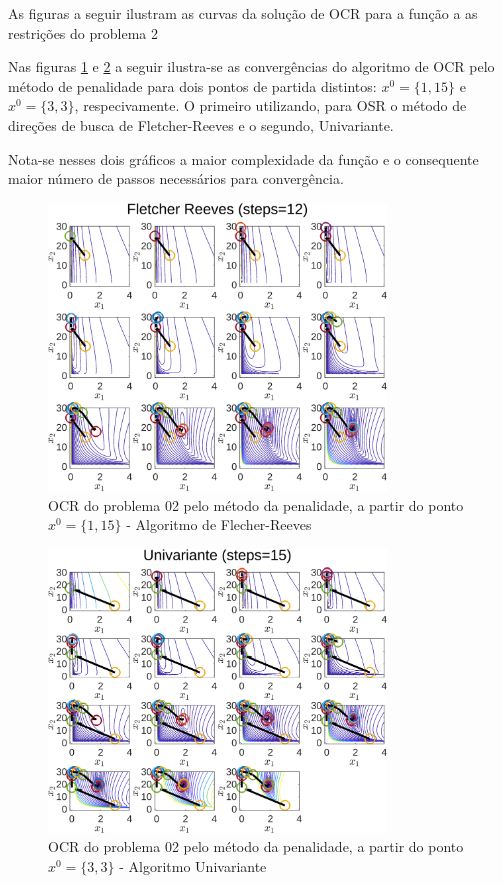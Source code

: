 \documentclass[10pt, a4paper]{article}
\begin{document}

As figuras a seguir ilustram as curvas da solu\c c\~ao de OCR para a fun\c c\~ao a as restri\c c\~oes do problema 2

Nas figuras \ref{fig:fig05} e \ref{fig:fig06} a seguir ilustra-se as converg\^encias do algoritmo de OCR pelo m\'etodo de penalidade para dois pontos de partida distintos: $x^0=\{1,15\}$ e $x^0=\{3,3\}$, respecivamente. O primeiro utilizando, para OSR o m\'etodo de dire\c c\~oes de busca de Fletcher-Reeves e o segundo, Univariante.

Nota-se nesses dois gr\'aficos a maior complexidade da fun\c c\~ao e o consequente maior n\'umero de passos necess\'arios para converg\^encia.

\begin{figure}[H]
      \centering
      \includegraphics[width=0.8\textwidth]{fig05_P02_PEN_X1_FR.png}
      \caption{OCR do problema 02 pelo m\'etodo da penalidade, a partir do ponto $x^0=\{1,15\}$ - Algoritmo de Flecher-Reeves}
      \label{fig:fig05}
\end{figure}
\begin{figure}[H]
      \centering
      \includegraphics[width=0.8\textwidth]{fig06_P02_PEN_X2_UNI.png}
      \caption{OCR do problema 02 pelo m\'etodo da penalidade, a partir do ponto $x^0=\{3,3\}$ - Algoritmo Univariante}
      \label{fig:fig06}
\end{figure}
\end{document}
